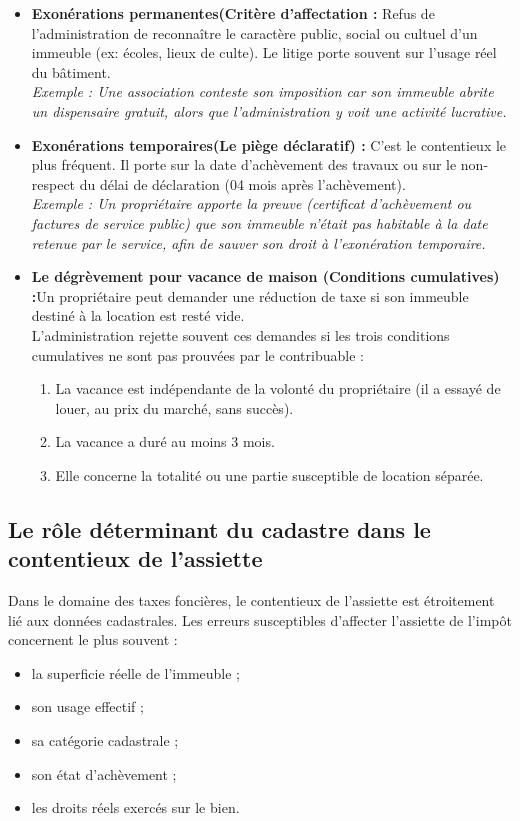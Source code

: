 \documentclass[Cours_contentieuxTF2026.tex]{subfiles}
\begin{document}
\begin{itemize}
	\item \textbf{Exonérations permanentes(Critère d'affectation :} Refus de l'administration de reconnaître le caractère public, social ou cultuel d'un immeuble (ex: écoles, lieux de culte). Le litige porte souvent sur l'usage réel du bâtiment.\\
	\textit{Exemple : Une association conteste son imposition car son immeuble abrite un dispensaire gratuit, alors que l'administration y voit une activité lucrative.}\\
	
	\item \textbf{Exonérations temporaires(Le piège déclaratif) :} C'est le contentieux le plus fréquent. Il porte sur la date d'achèvement des travaux ou sur le non-respect du délai de déclaration (04 mois après l'achèvement).\\
	\textit{Exemple : Un propriétaire apporte la preuve (certificat d'achèvement ou factures de service public) que son immeuble n'était pas habitable à la date retenue par le service, afin de sauver son droit à l'exonération temporaire.}\\
	
	\item \textbf{Le dégrèvement pour vacance de maison (Conditions cumulatives) :}Un propriétaire peut demander une réduction de taxe si son immeuble destiné à la location est resté vide.\\
	L'administration rejette souvent ces demandes si les trois conditions cumulatives ne sont pas prouvées par le contribuable :
	\begin{enumerate}
		\item La vacance est indépendante de la volonté du propriétaire (il a essayé de louer, au prix du marché, sans succès).
		\item La vacance a duré au moins 3 mois.
		\item Elle concerne la totalité ou une partie susceptible de location séparée.
	\end{enumerate}
\end{itemize}

\subsection{Le rôle déterminant du cadastre dans le contentieux de l’assiette}

Dans le domaine des taxes foncières, le contentieux de l’assiette est étroitement lié
aux données cadastrales. Les erreurs susceptibles d’affecter l’assiette de l’impôt
concernent le plus souvent :
\begin{itemize}
	\item la superficie réelle de l’immeuble ;
	\item son usage effectif ;
	\item sa catégorie cadastrale ;
	\item son état d’achèvement ;
	\item les droits réels exercés sur le bien.
\end{itemize}
\end{document}
